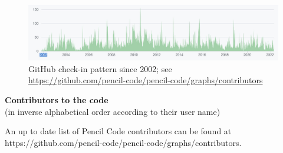 \documentclass[\mydriver,12pt,twoside,notitlepage,a4paper]{article}
\begin{document}
\begin{figure}[htb]
  \centering
  \includegraphics[width=.99\textwidth,keepaspectratio]{GitHub-ci}
  \caption{GitHub check-in pattern since 2002; see\\
  \url{https://github.com/pencil-code/pencil-code/graphs/contributors}
  }
  \label{GitHub}
\end{figure}

\newpage

\begin{center}
  {\bf Contributors to the code}\\
  (in inverse alphabetical order according to their user name)\\
\end{center}

An up to date list of Pencil Code contributors can be found at
{https://github.com/pencil-code/pencil-code/graphs/contributors}.
\end{document}
